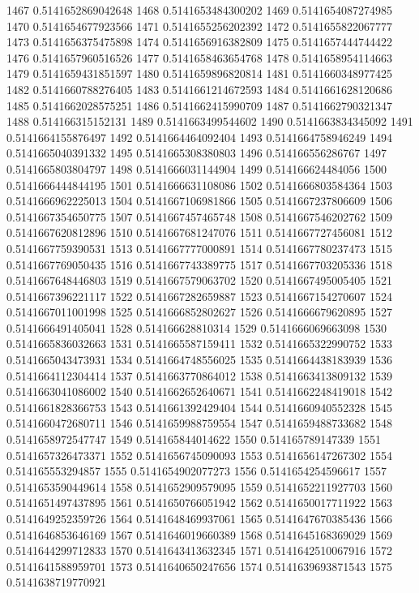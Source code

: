 1467 0.5141652869042648
1468 0.5141653484300202
1469 0.5141654087274985
1470 0.5141654677923566
1471 0.5141655256202392
1472 0.5141655822067777
1473 0.5141656375475898
1474 0.5141656916382809
1475 0.5141657444744422
1476 0.5141657960516526
1477 0.5141658463654768
1478 0.5141658954114663
1479 0.5141659431851597
1480 0.5141659896820814
1481 0.5141660348977425
1482 0.5141660788276405
1483 0.5141661214672593
1484 0.5141661628120686
1485 0.5141662028575251
1486 0.5141662415990709
1487 0.5141662790321347
1488 0.514166315152131
1489 0.5141663499544602
1490 0.5141663834345092
1491 0.5141664155876497
1492 0.5141664464092404
1493 0.5141664758946249
1494 0.5141665040391332
1495 0.5141665308380803
1496 0.514166556286767
1497 0.5141665803804797
1498 0.5141666031144904
1499 0.514166624484056
1500 0.5141666444844195
1501 0.5141666631108086
1502 0.5141666803584364
1503 0.5141666962225013
1504 0.5141667106981866
1505 0.5141667237806609
1506 0.5141667354650775
1507 0.5141667457465748
1508 0.5141667546202762
1509 0.5141667620812896
1510 0.5141667681247076
1511 0.5141667727456081
1512 0.5141667759390531
1513 0.5141667777000891
1514 0.5141667780237473
1515 0.5141667769050435
1516 0.5141667743389775
1517 0.5141667703205336
1518 0.5141667648446803
1519 0.5141667579063702
1520 0.5141667495005405
1521 0.5141667396221117
1522 0.5141667282659887
1523 0.5141667154270607
1524 0.5141667011001998
1525 0.5141666852802627
1526 0.5141666679620895
1527 0.5141666491405041
1528 0.514166628810314
1529 0.5141666069663098
1530 0.5141665836032663
1531 0.5141665587159411
1532 0.5141665322990752
1533 0.5141665043473931
1534 0.5141664748556025
1535 0.5141664438183939
1536 0.5141664112304414
1537 0.5141663770864012
1538 0.5141663413809132
1539 0.5141663041086002
1540 0.5141662652640671
1541 0.5141662248419018
1542 0.5141661828366753
1543 0.5141661392429404
1544 0.5141660940552328
1545 0.5141660472680711
1546 0.5141659988759554
1547 0.5141659488733682
1548 0.5141658972547747
1549 0.514165844014622
1550 0.514165789147339
1551 0.5141657326473371
1552 0.5141656745090093
1553 0.5141656147267302
1554 0.514165553294857
1555 0.5141654902077273
1556 0.5141654254596617
1557 0.5141653590449614
1558 0.5141652909579095
1559 0.5141652211927703
1560 0.5141651497437895
1561 0.5141650766051942
1562 0.5141650017711922
1563 0.5141649252359726
1564 0.5141648469937061
1565 0.5141647670385436
1566 0.5141646853646169
1567 0.5141646019660389
1568 0.5141645168369029
1569 0.5141644299712833
1570 0.5141643413632345
1571 0.5141642510067916
1572 0.5141641588959701
1573 0.5141640650247656
1574 0.5141639693871543
1575 0.5141638719770921
